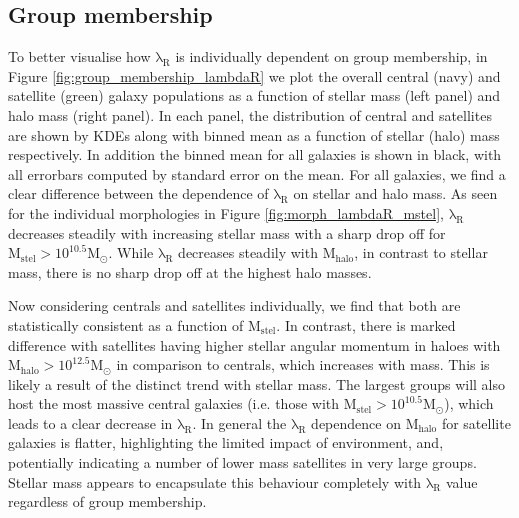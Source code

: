 \subsection{Group membership}
To better visualise how $\mathrm{\lambda_R}$ is individually dependent on group membership, in Figure \ref{fig:group_membership_lambdaR} we plot the overall central (navy) and satellite (green) galaxy populations as a function of stellar mass (left panel) and halo mass (right panel). In each panel, the distribution of central and satellites are shown by KDEs along with binned mean as a function of stellar (halo) mass respectively. In addition the binned mean for all galaxies is shown in black, with all errorbars computed by standard error on the mean. For all galaxies, we find a clear difference between the dependence of $\mathrm{\lambda_R}$ on stellar and halo mass. As seen for the individual morphologies in Figure \ref{fig:morph_lambdaR_mstel}, $\mathrm{\lambda_R}$ decreases steadily with increasing stellar mass with a sharp drop off for $\mathrm{M_{stel} > 10^{10.5}M_{\odot}}$. While $\mathrm{\lambda_R}$ decreases steadily with $\mathrm{M_{halo}}$, in contrast to stellar mass, there is no sharp drop off at the highest halo masses. 

Now considering centrals and satellites individually, we find that both are statistically consistent as a function of $\mathrm{M_{stel}}$. In contrast, there is marked difference with satellites having higher stellar angular momentum in haloes with $\mathrm{M_{halo} > 10^{12.5}M_{\odot}}$ in comparison to centrals, which increases with mass. This is likely a result of the distinct trend with stellar mass. The largest groups will also host the most massive central galaxies (i.e. those with $\mathrm{M_{stel} > 10^{10.5}M_{\odot}}$), which leads to a clear decrease in $\mathrm{\lambda_R}$. In general the $\mathrm{\lambda_R}$ dependence on $\mathrm{M_{halo}}$ for satellite galaxies is flatter, highlighting the limited impact of environment, and, potentially indicating a number of lower mass satellites in very large groups. Stellar mass appears to encapsulate this behaviour completely with $\mathrm{\lambda_R}$ value regardless of group membership.

